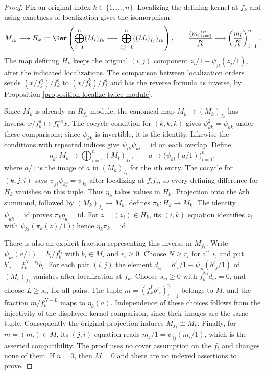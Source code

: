 \begin{proof}
Fix an original index $k\in\{1,\ldots,n\}$.
Localizing the defining kernel at $f_k$ and using exactness of
localization gives the isomorphism
$$
M_{f_k}\longrightarrow H_k:=
\Ker\left(
\bigoplus_{i=1}^n(M_i)_{f_k}\longrightarrow
\bigoplus_{i,j=1}^n((M_i)_{f_j})_{f_k}
\right),\qquad
\frac{(m_i)_{i=1}^n}{f_k^a}\longmapsto
\left(\frac{m_i}{f_k^a}\right)_{i=1}^n.
$$
The map defining $H_k$ keeps the original $(i,j)$ component
$z_i/1-\psi_{ji}(z_j/1)$, after the indicated localizations.
The comparison between localization orders sends
$(x/f_j^a)/f_k^b$ to $(x/f_k^b)/f_j^a$ and has the reverse
formula as inverse, by Proposition \ref{proposition-localize-twice-module}.

\medskip\noindent
Since $M_k$ is already an $R_{f_k}$-module, the canonical map
$M_k\to(M_k)_{f_k}$ has inverse
$x/f_k^a\mapsto f_k^{-a}x$.
The cocycle condition for $(k,k,k)$ gives $\psi_{kk}^2=\psi_{kk}$
under these comparisons; since $\psi_{kk}$ is invertible, it is the
identity. Likewise the conditions with repeated indices give
$\psi_{ik}\psi_{ki}=\mathrm{id}$ on each overlap.
Define
$$
\eta_k:M_k\longrightarrow\bigoplus_{i=1}^n(M_i)_{f_k},\qquad
a\longmapsto\bigl(\psi_{ki}(a/1)\bigr)_{i=1}^n,
$$
where $a/1$ is the image of $a$ in $(M_k)_{f_i}$ for the $i$th entry.
The cocycle for $(k,j,i)$ says
$\psi_{ji}\psi_{kj}=\psi_{ki}$ after localizing at $f_if_j$,
so every defining difference for $H_k$ vanishes on this tuple.
Thus $\eta_k$ takes values in $H_k$.
Projection onto the $k$th summand, followed by
$(M_k)_{f_k}\to M_k$, defines $\pi_k:H_k\to M_k$.
The identity $\psi_{kk}=\mathrm{id}$ proves $\pi_k\eta_k=\mathrm{id}$.
For $z=(z_i)\in H_k$, its $(i,k)$ equation identifies $z_i$
with $\psi_{ki}(\pi_k(z)/1)$; hence $\eta_k\pi_k=\mathrm{id}$.

\medskip\noindent
There is also an explicit fraction representing this inverse in $M_{f_k}$.
Write $\psi_{ki}(a/1)=b_i/f_k^{r_i}$ with $b_i\in M_i$ and $r_i\geq0$.
Choose $N\geq r_i$ for all $i$, and put $b'_i=f_k^{N-r_i}b_i$.
For each pair $(i,j)$ the element
$d_{ij}=b'_i/1-\psi_{ji}(b'_j/1)$ of $(M_i)_{f_j}$
vanishes after localization at $f_k$.
Choose $s_{ij}\geq0$ with $f_k^{s_{ij}}d_{ij}=0$, and choose
$L\geq s_{ij}$ for all pairs. The tuple
$m=(f_k^Lb'_i)_{i=1}^n$ belongs to $M$, and the fraction
$m/f_k^{N+L}$ maps to $\eta_k(a)$.
Independence of these choices follows from the injectivity of the
displayed kernel comparison, since their images are the same tuple.
Consequently the original projection induces $M_{f_k}\cong M_k$.
Finally, for $m=(m_i)\in M$, its $(j,i)$ equation reads
$m_j/1=\psi_{ij}(m_i/1)$, which is the asserted compatibility.
The proof uses no cover assumption on the $f_i$ and changes none of them.
If $n=0$, then $M=0$ and there are no indexed assertions to prove.
\end{proof}